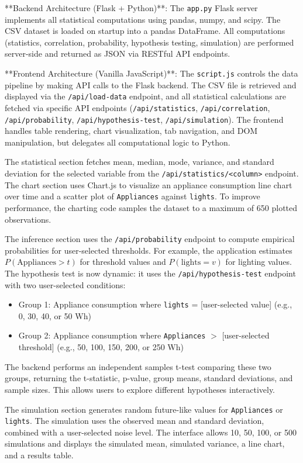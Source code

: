 \documentclass[12pt,a4paper]{article}
\begin{document}
**Backend Architecture (Flask + Python)**:
The \texttt{app.py} Flask server implements all statistical computations using pandas, numpy, and scipy. The CSV dataset is loaded on startup into a pandas DataFrame. All computations (statistics, correlation, probability, hypothesis testing, simulation) are performed server-side and returned as JSON via RESTful API endpoints.

**Frontend Architecture (Vanilla JavaScript)**:
The \texttt{script.js} controls the data pipeline by making API calls to the Flask backend. The CSV file is retrieved and displayed via the \texttt{/api/load-data} endpoint, and all statistical calculations are fetched via specific API endpoints (\texttt{/api/statistics}, \texttt{/api/correlation}, \texttt{/api/probability}, \texttt{/api/hypothesis-test}, \texttt{/api/simulation}). The frontend handles table rendering, chart visualization, tab navigation, and DOM manipulation, but delegates all computational logic to Python.

The statistical section fetches mean, median, mode, variance, and standard deviation for the selected variable from the \texttt{/api/statistics/<column>} endpoint. The chart section uses Chart.js to visualize an appliance consumption line chart over time and a scatter plot of \texttt{Appliances} against \texttt{lights}. To improve performance, the charting code samples the dataset to a maximum of 650 plotted observations.

The inference section uses the \texttt{/api/probability} endpoint to compute empirical probabilities for user-selected thresholds. For example, the application estimates $P(\mathrm{Appliances} > t)$ for threshold values and $P(\mathrm{lights}=v)$ for lighting values. The hypothesis test is now dynamic: it uses the \texttt{/api/hypothesis-test} endpoint with two user-selected conditions:
\begin{itemize}
  \item Group 1: Appliance consumption where \texttt{lights} = [user-selected value] (e.g., 0, 30, 40, or 50 Wh)
  \item Group 2: Appliance consumption where \texttt{Appliances} $>$ [user-selected threshold] (e.g., 50, 100, 150, 200, or 250 Wh)
\end{itemize}
The backend performs an independent samples t-test comparing these two groups, returning the t-statistic, p-value, group means, standard deviations, and sample sizes. This allows users to explore different hypotheses interactively.

The simulation section generates random future-like values for \texttt{Appliances} or \texttt{lights}. The simulation uses the observed mean and standard deviation, combined with a user-selected noise level. The interface allows 10, 50, 100, or 500 simulations and displays the simulated mean, simulated variance, a line chart, and a results table.
\end{document}
